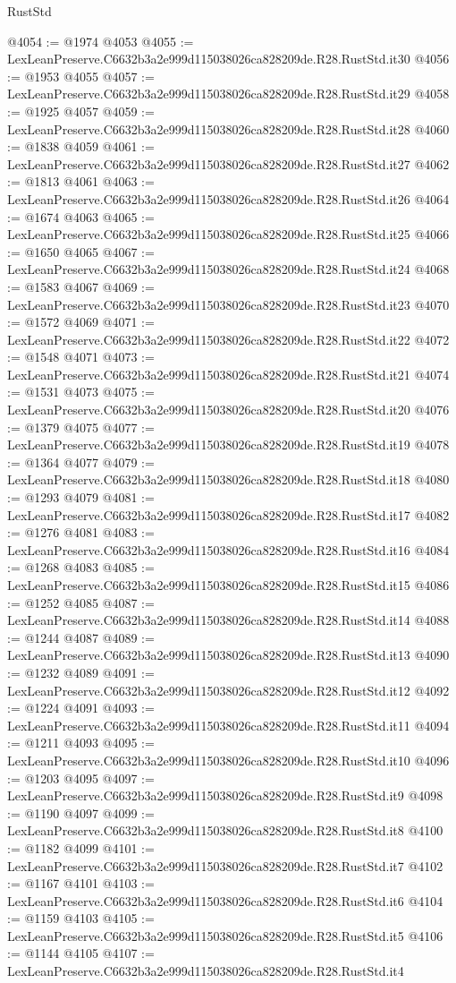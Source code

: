 \begin{lexlean}{RustStd}
\begin{coremodule}
@4054 := @1974 @4053
@4055 := LexLeanPreserve.C6632b3a2e999d115038026ca828209de.R28.RustStd.it30
@4056 := @1953 @4055
@4057 := LexLeanPreserve.C6632b3a2e999d115038026ca828209de.R28.RustStd.it29
@4058 := @1925 @4057
@4059 := LexLeanPreserve.C6632b3a2e999d115038026ca828209de.R28.RustStd.it28
@4060 := @1838 @4059
@4061 := LexLeanPreserve.C6632b3a2e999d115038026ca828209de.R28.RustStd.it27
@4062 := @1813 @4061
@4063 := LexLeanPreserve.C6632b3a2e999d115038026ca828209de.R28.RustStd.it26
@4064 := @1674 @4063
@4065 := LexLeanPreserve.C6632b3a2e999d115038026ca828209de.R28.RustStd.it25
@4066 := @1650 @4065
@4067 := LexLeanPreserve.C6632b3a2e999d115038026ca828209de.R28.RustStd.it24
@4068 := @1583 @4067
@4069 := LexLeanPreserve.C6632b3a2e999d115038026ca828209de.R28.RustStd.it23
@4070 := @1572 @4069
@4071 := LexLeanPreserve.C6632b3a2e999d115038026ca828209de.R28.RustStd.it22
@4072 := @1548 @4071
@4073 := LexLeanPreserve.C6632b3a2e999d115038026ca828209de.R28.RustStd.it21
@4074 := @1531 @4073
@4075 := LexLeanPreserve.C6632b3a2e999d115038026ca828209de.R28.RustStd.it20
@4076 := @1379 @4075
@4077 := LexLeanPreserve.C6632b3a2e999d115038026ca828209de.R28.RustStd.it19
@4078 := @1364 @4077
@4079 := LexLeanPreserve.C6632b3a2e999d115038026ca828209de.R28.RustStd.it18
@4080 := @1293 @4079
@4081 := LexLeanPreserve.C6632b3a2e999d115038026ca828209de.R28.RustStd.it17
@4082 := @1276 @4081
@4083 := LexLeanPreserve.C6632b3a2e999d115038026ca828209de.R28.RustStd.it16
@4084 := @1268 @4083
@4085 := LexLeanPreserve.C6632b3a2e999d115038026ca828209de.R28.RustStd.it15
@4086 := @1252 @4085
@4087 := LexLeanPreserve.C6632b3a2e999d115038026ca828209de.R28.RustStd.it14
@4088 := @1244 @4087
@4089 := LexLeanPreserve.C6632b3a2e999d115038026ca828209de.R28.RustStd.it13
@4090 := @1232 @4089
@4091 := LexLeanPreserve.C6632b3a2e999d115038026ca828209de.R28.RustStd.it12
@4092 := @1224 @4091
@4093 := LexLeanPreserve.C6632b3a2e999d115038026ca828209de.R28.RustStd.it11
@4094 := @1211 @4093
@4095 := LexLeanPreserve.C6632b3a2e999d115038026ca828209de.R28.RustStd.it10
@4096 := @1203 @4095
@4097 := LexLeanPreserve.C6632b3a2e999d115038026ca828209de.R28.RustStd.it9
@4098 := @1190 @4097
@4099 := LexLeanPreserve.C6632b3a2e999d115038026ca828209de.R28.RustStd.it8
@4100 := @1182 @4099
@4101 := LexLeanPreserve.C6632b3a2e999d115038026ca828209de.R28.RustStd.it7
@4102 := @1167 @4101
@4103 := LexLeanPreserve.C6632b3a2e999d115038026ca828209de.R28.RustStd.it6
@4104 := @1159 @4103
@4105 := LexLeanPreserve.C6632b3a2e999d115038026ca828209de.R28.RustStd.it5
@4106 := @1144 @4105
@4107 := LexLeanPreserve.C6632b3a2e999d115038026ca828209de.R28.RustStd.it4

\end{coremodule}
\end{lexlean}
